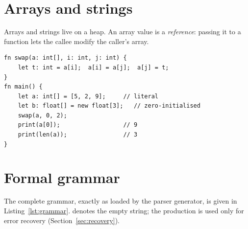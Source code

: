 \section{Arrays and strings}
Arrays and strings live on a heap. An array value is a \emph{reference}: passing it to a function lets the callee modify the caller's array.

\begin{lstlisting}[language=nova,caption={Arrays are passed by reference (from the shipped example \texttt{09\_arrays}).},label={lst:arrays}]
fn swap(a: int[], i: int, j: int) {
    let t: int = a[i];  a[i] = a[j];  a[j] = t;
}
fn main() {
    let a: int[] = [5, 2, 9];     // literal
    let b: float[] = new float[3];   // zero-initialised
    swap(a, 0, 2);
    print(a[0]);                  // 9
    print(len(a));                // 3
}
\end{lstlisting}

\section{Formal grammar}
The complete grammar, exactly as loaded by the parser generator, is given in Listing~\ref{lst:grammar}.  denotes the empty string; the production  is used only for error recovery (Section~\ref{sec:recovery}).

\begin{figure}[H]
\centering
\begin{minipage}{0.96\textwidth}
\begingroup{}

\endgroup
\end{minipage}
\end{figure}
